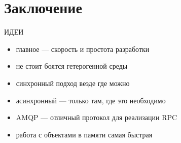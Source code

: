\documentclass[aspectratio=169]{beamer}
\begin{document}
\section{Заключение}
{
\begin{frame}[plain]{}
\end{frame}
}

\begin{frame}{ИДЕИ}
    \begin{itemize}
        \item главное --- скорость и простота разработки
        \item не стоит боятся гетерогенной среды
        \item синхронный подход везде где можно
        \item асинхронный --- только там, где это необходимо
        \item AMQP --- отличный протокол для реализации RPC
        \item работа с объектами в памяти самая быстрая
    \end{itemize}
\end{frame}
\end{document}

